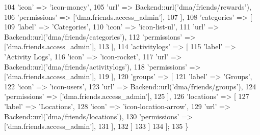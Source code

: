 \begin{DoxyCode}
104                         \textcolor{stringliteral}{'icon'}          => \textcolor{stringliteral}{'icon-money'},
105                         \textcolor{stringliteral}{'url'}           => Backend::url(\textcolor{stringliteral}{'dma/friends/rewards'}),
106                         \textcolor{stringliteral}{'permissions'}   => [\textcolor{stringliteral}{'dma.friends.access\_admin'}],
107                     ],
108                     \textcolor{stringliteral}{'categories'} => [
109                         \textcolor{stringliteral}{'label'}         => \textcolor{stringliteral}{'Categories'},
110                         \textcolor{stringliteral}{'icon'}          => \textcolor{stringliteral}{'icon-list-ul'},
111                         \textcolor{stringliteral}{'url'}           => Backend::url(\textcolor{stringliteral}{'dma/friends/categories'}),
112                         \textcolor{stringliteral}{'permissions'}   => [\textcolor{stringliteral}{'dma.friends.access\_admin'}],
113                     ],  
114                     \textcolor{stringliteral}{'activitylogs'}   => [
115                         \textcolor{stringliteral}{'label'}         => \textcolor{stringliteral}{'Activity Logs'},
116                         \textcolor{stringliteral}{'icon'}          => \textcolor{stringliteral}{'icon-rocket'},
117                         \textcolor{stringliteral}{'url'}           => Backend::url(\textcolor{stringliteral}{'dma/friends/activitylogs'}),
118                         \textcolor{stringliteral}{'permissions'}   => [\textcolor{stringliteral}{'dma.friends.access\_admin'}],
119                     ],
120                     \textcolor{stringliteral}{'groups'}   => [
121                         \textcolor{stringliteral}{'label'}         => \textcolor{stringliteral}{'Groups'},
122                         \textcolor{stringliteral}{'icon'}          => \textcolor{stringliteral}{'icon-users'},
123                         \textcolor{stringliteral}{'url'}           => Backend::url(\textcolor{stringliteral}{'dma/friends/groups'}),
124                         \textcolor{stringliteral}{'permissions'}   => [\textcolor{stringliteral}{'dma.friends.access\_admin'}],
125                     ],
126                     \textcolor{stringliteral}{'locations'} => [
127                         \textcolor{stringliteral}{'label'}         => \textcolor{stringliteral}{'Locations'},
128                         \textcolor{stringliteral}{'icon'}          => \textcolor{stringliteral}{'icon-location-arrow'},
129                         \textcolor{stringliteral}{'url'}           => Backend::url(\textcolor{stringliteral}{'dma/friends/locations'}),
130                         \textcolor{stringliteral}{'permissions'}   => [\textcolor{stringliteral}{'dma.friends.access\_admin'}],
131                     ],                
132                 ]
133             ]
134         ];
135     \}
\end{DoxyCode}
\hypertarget{classDMA_1_1Friends_1_1Plugin_a1f5f007ec6f0f3f16516cf1a2e19d296}{}
